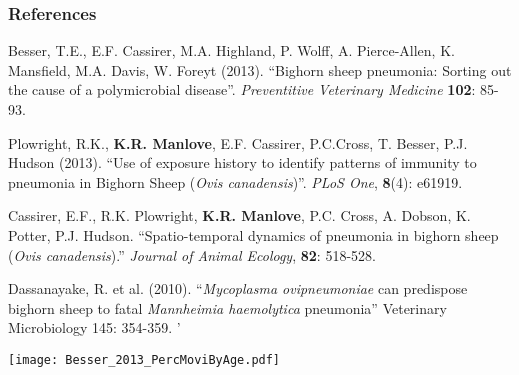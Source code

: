 \documentclass[fleqn,xcolor=table]{beamer}
\begin{document}
{

\begin{frame}[t]
\frametitle{References}
\begin{itemize}
\tiny{

\item[] Besser, T.E., E.F. Cassirer, M.A. Highland, P. Wolff, A. Pierce-Allen,
	K. Mansfield, M.A. Davis, W. Foreyt (2013). ``Bighorn sheep pneumonia:
	Sorting out the cause of a polymicrobial disease''.  \textit{Preventitive
	Veterinary Medicine} \textbf{102}: 85-93.
	\vspace{.1in}

\item[] Plowright, R.K.,\textbf{ K.R. Manlove}, E.F. Cassirer, P.C.Cross, T.
Besser, P.J. Hudson (2013). ``Use of exposure history to identify patterns of
immunity to pneumonia in Bighorn Sheep (\textit{Ovis canadensis})''.
\textit{PLoS One}, \textbf{8}(4): e61919. 

  \vspace{.1in}
   
\item[] Cassirer, E.F., R.K. Plowright, \textbf{K.R. Manlove}, P.C. Cross, A.
Dobson, K. Potter, P.J. Hudson.  ``Spatio-temporal dynamics of pneumonia in
bighorn sheep (\textit{Ovis canadensis}).'' \textit{Journal of Animal Ecology},
\textbf{82}: 518-528.
  \vspace{.1in}
  
\item[] Dassanayake, R. et al. (2010). ``\textit{Mycoplasma ovipneumoniae} can
predispose bighorn sheep to fatal \textit{Mannheimia haemolytica} pneumonia''
Veterinary Microbiology 145: 354-359.
'}
  \end{itemize}
\end{frame}
}

\begin{frame}
	\texttt{[image: Besser\_2013\_PercMoviByAge.pdf]}
\end{frame}
\end{document}
